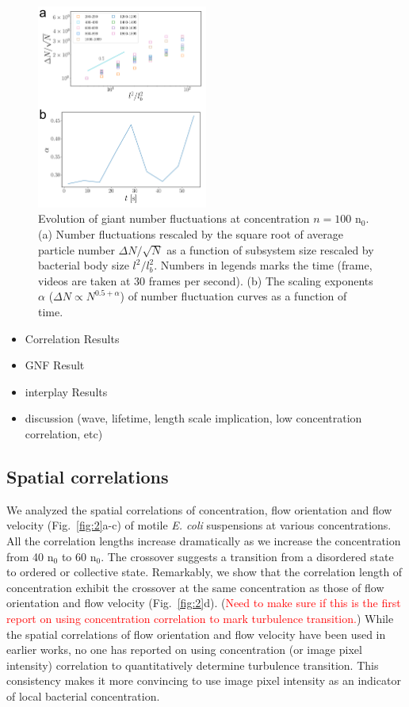 \documentclass[twocolumn,aps,pre,amsmath,amssymb,floatfix,longbibliography]{revtex4-1}
\begin{document}
\begin{figure}[!]
\begin{center}
\includegraphics[width=0.5\textwidth]{GNF_kinetics_conbine.png}
\caption[]{Evolution of giant number fluctuations at concentration $n=100$ n$_0$. (a) Number fluctuations rescaled by the square root of average particle number $\Delta N/\sqrt N$ as a function of subsystem size rescaled by bacterial body size $l^2/l_b^2$. Numbers in legends marks the time (frame, videos are taken at 30 frames per second).  (b) The scaling exponents $\alpha$ ($\Delta N \propto N^{0.5+\alpha}$) of number fluctuation curves as a function of time.}
\label{fig:4}
\end{center}
\end{figure}

\begin{itemize}
\item Correlation Results
\item GNF Result
\item interplay Results
\item discussion (wave, lifetime, length scale implication, low concentration correlation, etc)
\end{itemize}

\subsection{Spatial correlations}
We analyzed the spatial correlations of concentration, flow orientation and flow velocity (Fig.~\ref{fig:2}a-c) of motile \textit{E. coli} suspensions at various concentrations. All the correlation lengths increase dramatically as we increase the concentration from 40 n$_0$ to 60 n$_0$. The crossover suggests a transition from a disordered state to ordered or collective state. Remarkably, we show that the correlation length of concentration exhibit the crossover at the same concentration as those of flow orientation and flow velocity (Fig.~\ref{fig:2}d). (\textcolor{red}{Need to make sure if this is the first report on using concentration correlation to mark turbulence transition.}) While the spatial correlations of flow orientation and flow velocity have been used in earlier works, no one has reported on using concentration (or image pixel intensity) correlation to quantitatively determine turbulence transition. This consistency makes it more convincing to use image pixel intensity as an indicator of local bacterial concentration.
\end{document}
